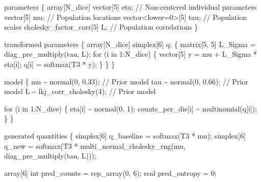 \documentclass[
  letterpaper,
  DIV=11,
  numbers=noendperiod]{scrartcl}
\newenvironment{Shaded}{\begin{snugshade}}{\end{snugshade}}
\newcommand{\CommentTok}[1]{\textcolor[rgb]{0.37,0.37,0.37}{#1}}
\newcommand{\ControlFlowTok}[1]{\textcolor[rgb]{0.00,0.23,0.31}{#1}}
\newcommand{\DataTypeTok}[1]{\textcolor[rgb]{0.68,0.00,0.00}{#1}}
\newcommand{\DecValTok}[1]{\textcolor[rgb]{0.68,0.00,0.00}{#1}}
\newcommand{\FloatTok}[1]{\textcolor[rgb]{0.68,0.00,0.00}{#1}}
\newcommand{\KeywordTok}[1]{\textcolor[rgb]{0.00,0.23,0.31}{#1}}
\newcommand{\NormalTok}[1]{\textcolor[rgb]{0.00,0.23,0.31}{#1}}
\begin{document}
\begin{codelisting}
\begin{Shaded}
\begin{Highlighting}[]
\KeywordTok{parameters}\NormalTok{ \{}
  \DataTypeTok{array}\NormalTok{[N\_dice] }\DataTypeTok{vector}\NormalTok{[}\DecValTok{5}\NormalTok{] eta; }\CommentTok{// Non{-}centered individual parameters}
  \DataTypeTok{vector}\NormalTok{[}\DecValTok{5}\NormalTok{] mu;                }\CommentTok{// Population locations}
  \DataTypeTok{vector}\NormalTok{\textless{}}\KeywordTok{lower}\NormalTok{=}\DecValTok{0}\NormalTok{\textgreater{}[}\DecValTok{5}\NormalTok{] tau;      }\CommentTok{// Population scales}
  \DataTypeTok{cholesky\_factor\_corr}\NormalTok{[}\DecValTok{5}\NormalTok{] L;   }\CommentTok{// Population correlations}
\NormalTok{\}}

\KeywordTok{transformed parameters}\NormalTok{ \{}
  \DataTypeTok{array}\NormalTok{[N\_dice] }\DataTypeTok{simplex}\NormalTok{[}\DecValTok{6}\NormalTok{] q;}
\NormalTok{  \{}
    \DataTypeTok{matrix}\NormalTok{[}\DecValTok{5}\NormalTok{, }\DecValTok{5}\NormalTok{] L\_Sigma = diag\_pre\_multiply(tau, L);}
    \ControlFlowTok{for}\NormalTok{ (i }\ControlFlowTok{in} \DecValTok{1}\NormalTok{:N\_dice) \{}
      \DataTypeTok{vector}\NormalTok{[}\DecValTok{5}\NormalTok{] y = mu + L\_Sigma * eta[i];}
\NormalTok{      q[i] = softmax(T3 * y);}
\NormalTok{    \}}
\NormalTok{  \}}
\NormalTok{\}}

\KeywordTok{model}\NormalTok{ \{}
\NormalTok{  mu \textasciitilde{} normal(}\DecValTok{0}\NormalTok{, }\FloatTok{0.33}\NormalTok{);     }\CommentTok{// Prior model}
\NormalTok{  tau \textasciitilde{} normal(}\DecValTok{0}\NormalTok{, }\FloatTok{0.66}\NormalTok{);    }\CommentTok{// Prior model}
\NormalTok{  L \textasciitilde{} lkj\_corr\_cholesky(}\DecValTok{4}\NormalTok{); }\CommentTok{// Prior model}

  \ControlFlowTok{for}\NormalTok{ (i }\ControlFlowTok{in} \DecValTok{1}\NormalTok{:N\_dice) \{}
\NormalTok{    eta[i] \textasciitilde{} normal(}\DecValTok{0}\NormalTok{, }\DecValTok{1}\NormalTok{);}
\NormalTok{    counts\_per\_die[i] \textasciitilde{} multinomial(q[i]);}
\NormalTok{  \}}
\NormalTok{\}}

\KeywordTok{generated quantities}\NormalTok{ \{}
  \DataTypeTok{simplex}\NormalTok{[}\DecValTok{6}\NormalTok{] q\_baseline = softmax(T3 * mu);}
  \DataTypeTok{simplex}\NormalTok{[}\DecValTok{6}\NormalTok{] q\_new =}
\NormalTok{    softmax(T3 * multi\_normal\_cholesky\_rng(mu,}
\NormalTok{                                           diag\_pre\_multiply(tau, L)));}

  \DataTypeTok{array}\NormalTok{[}\DecValTok{6}\NormalTok{] }\DataTypeTok{int}\NormalTok{ pred\_counts = rep\_array(}\DecValTok{0}\NormalTok{, }\DecValTok{6}\NormalTok{);}
  \DataTypeTok{real}\NormalTok{ pred\_entropy = }\DecValTok{0}\NormalTok{;}


\end{Highlighting}
\end{Shaded}
\end{codelisting}
\end{document}
